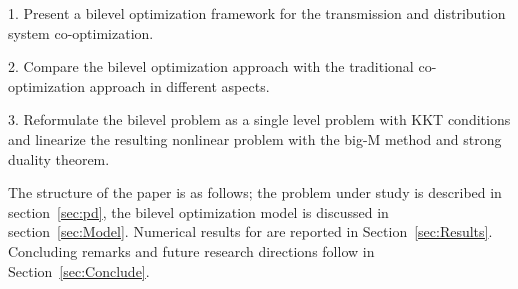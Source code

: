 1. Present a bilevel optimization framework for the transmission and distribution system co-optimization.

2. Compare the bilevel optimization approach with the traditional co-optimization approach in different aspects. 

3. Reformulate the bilevel problem as a single level problem with KKT conditions and linearize the resulting nonlinear problem with the big-M method and strong duality theorem.

The structure of the paper is as follows; the problem under study is described in section~\ref{sec:pd}, the bilevel optimization model is discussed in section~\ref{sec:Model}.  Numerical results for are reported in Section~\ref{sec:Results}. Concluding remarks and future research directions follow in Section~\ref{sec:Conclude}. 